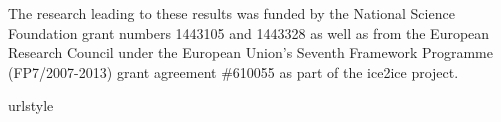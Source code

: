\documentclass[draft, jgrga]{AGUTeX}
\begin{document}
\begin{article}

\begin{acknowledgments}
The research leading to these results was funded by the National Science Foundation grant numbers 1443105 and 1443328 as well as from the European Research Council under the European Union's Seventh Framework Programme (FP7/2007-2013) grant agreement \#610055 as part of the ice2ice project.
\end{acknowledgments}











\begin{thebibliography}{}

\providecommand{\natexlab}[1]{#1}
\expandafter\ifx\csname urlstyle\endcsname\relax
  \providecommand{\doi}[1]{doi:\discretionary{}{}{}#1}\else
  \providecommand{\doi}{doi:\discretionary{}{}{}\begingroup
  \urlstyle{rm}\Url}\fi



\end{thebibliography}
\end{article}
\end{document}
